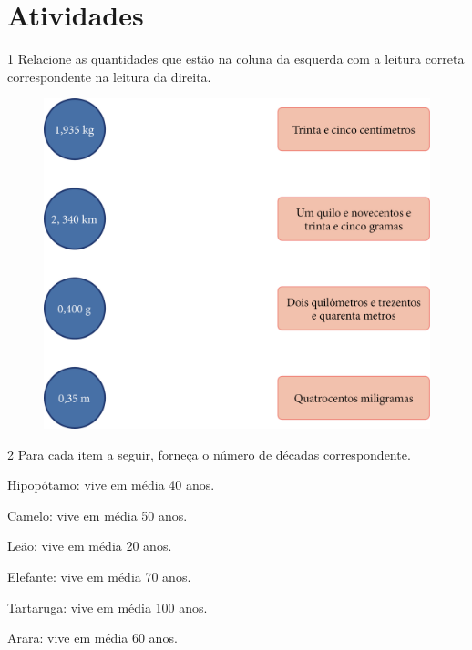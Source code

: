\section{Atividades}

\num{1} Relacione as quantidades que estão na coluna da esquerda com a leitura correta
correspondente na leitura da direita.

\begin{figure}[htpb!]
\centering
\includegraphics[width=\textwidth]{media/image20.png}
\end{figure}


\num{2} Para cada item a seguir, forneça o número de décadas correspondente.

\begin{escolha}
\item Hipopótamo: vive em média 40 anos.


\item Camelo: vive em média 50 anos.


\item Leão: vive em média 20 anos.


\item Elefante: vive em média 70 anos.


\item Tartaruga: vive em média 100 anos.


\item Arara: vive em média 60 anos.

\end{escolha}



